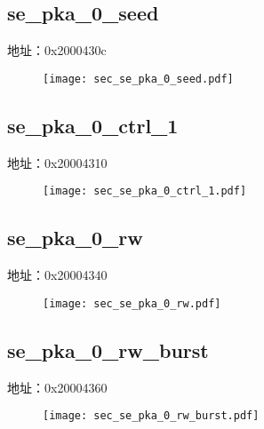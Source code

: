 \subsection{se\_pka\_0\_seed}
\label{sec-se-pka-0-seed}
地址：0x2000430c
 \begin{figure}[H]
\texttt{[image: sec\_se\_pka\_0\_seed.pdf]}
\end{figure}

\subsection{se\_pka\_0\_ctrl\_1}
\label{sec-se-pka-0-ctrl-1}
地址：0x20004310
 \begin{figure}[H]
\texttt{[image: sec\_se\_pka\_0\_ctrl\_1.pdf]}
\end{figure}

\subsection{se\_pka\_0\_rw}
\label{sec-se-pka-0-rw}
地址：0x20004340
 \begin{figure}[H]
\texttt{[image: sec\_se\_pka\_0\_rw.pdf]}
\end{figure}

\subsection{se\_pka\_0\_rw\_burst}
\label{sec-se-pka-0-rw-burst}
地址：0x20004360
 \begin{figure}[H]
\texttt{[image: sec\_se\_pka\_0\_rw\_burst.pdf]}
\end{figure}

